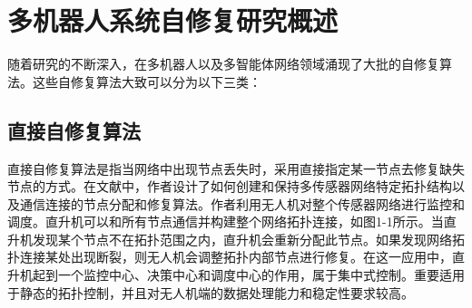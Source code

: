 \section{多机器人系统自修复研究概述}
随着研究的不断深入，在多机器人以及多智能体网络领域涌现了大批的自修复算法。这些自修复算法大致可以分为以下三类\supercite{张飞2010}：

\subsection{直接自修复算法}
直接自修复算法是指当网络中出现节点丢失时，采用直接指定某一节点去修复缺失节点的方式。在文献\parencite{corke2004autonomous}中，作者设计了如何创建和保持多传感器网络特定拓扑结构以及通信连接的节点分配和修复算法。作者利用无人机对整个传感器网络进行监控和调度。直升机可以和所有节点通信并构建整个网络拓扑连接，如图1-1所示。当直升机发现某个节点不在拓扑范围之内，直升机会重新分配此节点。如果发现网络拓扑连接某处出现断裂，则无人机会调整拓扑内部节点进行修复。在这一应用中，直升机起到一个监控中心、决策中心和调度中心的作用，属于集中式控制。重要适用于静态的拓扑控制，并且对无人机端的数据处理能力和稳定性要求较高。

\begin{figure*}[!htbp]
	\begin{multicols}{2}
		
		\begin{center}
		\end{center}
		\begin{center}
		\end{center}
		\begin{center}
		\end{center}
	\end{multicols}
\end{figure*}

